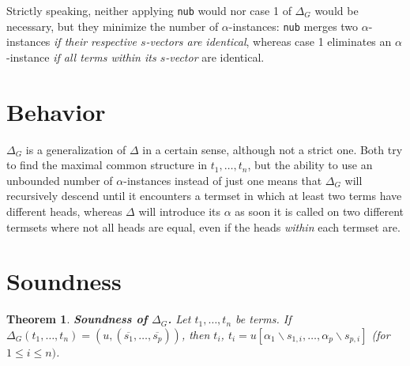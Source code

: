 \documentclass[a4paper, 11pt]{report}
\newtheorem{theorem}{Theorem}
\begin{document}
Strictly speaking, neither applying \texttt{nub} would nor case 1 of $\Delta_G$ would be necessary, but they minimize the number of $\alpha$-instances: \texttt{nub} merges two $\alpha$-instances {\em if their respective $s$-vectors are identical}, whereas case 1 eliminates an $\alpha$-instance {\em if all terms within its $s$-vector} are identical.

\section{Behavior}

$\Delta_G$ is a generalization of $\Delta$ in a certain sense, although not a strict one. Both try to find the maximal common structure in $t_1,\dots,t_n$, but the ability to use an unbounded number of $\alpha$-instances instead of just one means that $\Delta_G$ will recursively descend until it encounters a termset in which at least two terms have different heads, whereas $\Delta$ will introduce its $\alpha$ as soon it is called on two different termsets where not all heads are equal, even if the heads {\em within} each termset are.

\section{Soundness}

\begin{theorem}
\textbf{Soundness of $\Delta_G$.}
Let $t_1,\dots,t_n$ be terms. If $\Delta_G(t_1,\dots,t_n) = (u,(\overline{s_1},\dots,\overline{s_p}))$, then $t_i$, $t_i = u[\alpha_1\backslash s_{1,i},\dots,\alpha_p\backslash s_{p,i}]$ (for $1\leq i \leq n)$.
\label{thm:DeltaGSoundness}
\end{theorem}
\end{document}

